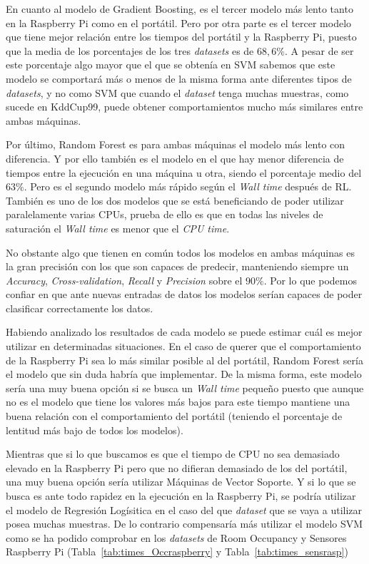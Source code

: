 \documentclass[a4paper, 12pt]{book}
\begin{document}
En cuanto al modelo de Gradient Boosting, es el tercer modelo más lento tanto en la Raspberry Pi como en el portátil. Pero por otra parte es el tercer modelo que tiene mejor relación entre los tiempos del portátil y la Raspberry Pi, puesto que la media de los porcentajes de los tres \textit{datasets} es de $68,6\%$. A pesar de ser este porcentaje algo mayor que el que se obtenía en SVM sabemos que este modelo se comportará más o menos de la misma forma ante diferentes tipos de \textit{datasets}, y no como SVM que cuando el \textit{dataset} tenga muchas muestras, como sucede en KddCup99, puede obtener comportamientos mucho más similares entre ambas máquinas.

Por último, Random Forest es para ambas máquinas el modelo más lento con diferencia. Y por ello también es el modelo en el que hay menor diferencia de tiempos entre la ejecución en una máquina u otra, siendo el porcentaje medio del $63\%$. Pero es el segundo modelo más rápido según el \textit{Wall time} después de RL. También es uno de los dos modelos que se está beneficiando de poder utilizar paralelamente varias CPUs, prueba de ello es que en todas las niveles de saturación el \textit{Wall time} es menor que el \textit{CPU time}.

No obstante algo que tienen en común todos los modelos en ambas máquinas es la gran precisión con los que son capaces de predecir, manteniendo siempre un \textit{Accuracy}, \textit{Cross-validation}, \textit{Recall} y \textit{Precision} sobre el $90\%$. Por lo que podemos confiar en que ante nuevas entradas de datos los modelos serían capaces de poder clasificar correctamente los datos.

Habiendo analizado los resultados de cada modelo se puede estimar cuál es mejor utilizar en determinadas situaciones. En el caso de querer que el comportamiento de la Raspberry Pi sea lo más similar posible al del portátil, Random Forest sería el modelo que sin duda habría que implementar. De la misma forma, este modelo sería una muy buena opción si se busca un \textit{Wall time} pequeño puesto que aunque no es el modelo que tiene los valores más bajos para este tiempo mantiene una buena relación con el comportamiento del portátil (teniendo el porcentaje de lentitud más bajo de todos los modelos).

Mientras que si lo que buscamos es que el tiempo de CPU no sea demasiado elevado en la Raspberry Pi pero que no difieran demasiado de los del portátil, una muy buena opción sería utilizar Máquinas de Vector Soporte.
Y si lo que se busca es ante todo rapidez en la ejecución en la Raspberry Pi, se podría utilizar el modelo de Regresión Logísitica en el caso del que \textit{dataset} que se vaya a utilizar posea muchas muestras. De lo contrario compensaría más utilizar el modelo SVM como se ha podido comprobar en los \textit{datasets} de Room Occupancy y Sensores Raspberry Pi (Tabla~\ref{tab:times_Occraspberry} y Tabla~\ref{tab:times_sensrasp})
 
\end{document}
